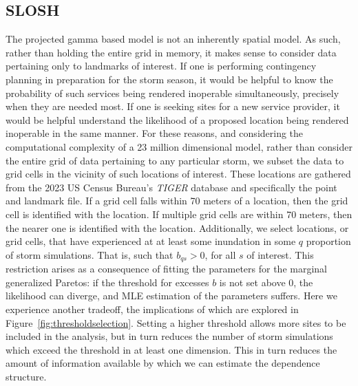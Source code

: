 \subsection{SLOSH}

The projected gamma based model is not an inherently spatial model.  
    As such, rather than holding the entire grid in memory, it makes sense to consider 
    data pertaining only to landmarks of interest.    If one is performing 
    contingency planning in preparation for the storm season, it would be 
    helpful to know the probability of such services being rendered inoperable 
    simultaneously, precisely when they are needed most.  If one is seeking 
    sites for a new service provider, it would be helpful understand the 
    likelihood of a proposed location being rendered inoperable in the same 
    manner.  For these reasons, and considering the computational complexity of 
    a 23 million dimensional model, rather than consider the entire grid of data 
    pertaining to any particular storm, we subset the data to grid cells in the 
    vicinity of such locations of interest.  These locations are gathered from 
    the 2023 US Census Bureau's \emph{TIGER} database \needcite and specifically 
    the point and landmark file.  If a grid cell falls within 70 meters of a location,
    then the grid cell is identified with the location.  If multiple grid cells
    are within 70 meters, then the nearer one is identified with the location.
    Additionally, we select locations, or grid cells, that have experienced at
    at least some inundation in some $q$ proportion of storm simulations.  That is,
    such that $b_{qs} > 0$, for all $s$ of interest.  This restriction arises
    as a consequence of fitting the parameters for the marginal generalized Paretos:
    if the threshold for excesses $b$ is not set above $0$, the likelihood can diverge, 
    and MLE estimation of the parameters suffers. Here we experience another
    tradeoff, the implications of which are explored in 
    Figure~\ref{fig:thresholdselection}.  Setting a higher threshold allows more 
    sites to be included in the analysis, but in turn reduces the number of storm 
    simulations which exceed the threshold in at least one dimension.  This in turn 
    reduces the amount of information available by which we can estimate the 
    dependence structure.

